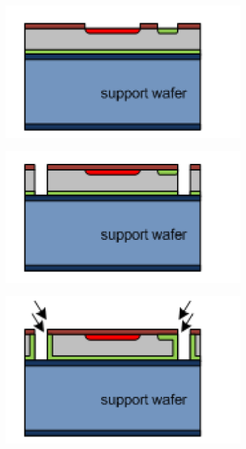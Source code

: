 \begin{figure}[htbp]
  \begin{subfigure}[b]{0.3\textwidth}
    \centering
    \includegraphics[width=\textwidth]{figures/ActiveEdge/advacamProcess/wafer_4.pdf}
    \caption{}
  \end{subfigure}\hfill
  \begin{subfigure}[b]{0.3\textwidth}
    \includegraphics[width=\textwidth]{figures/ActiveEdge/advacamProcess/wafer_5.pdf}
    \caption{}
  \end{subfigure}\hfill
  \begin{subfigure}[b]{0.3\textwidth}
    \includegraphics[width=\textwidth]{figures/ActiveEdge/advacamProcess/wafer_6.pdf}
    \caption{}
  \end{subfigure} \\


\end{figure}
